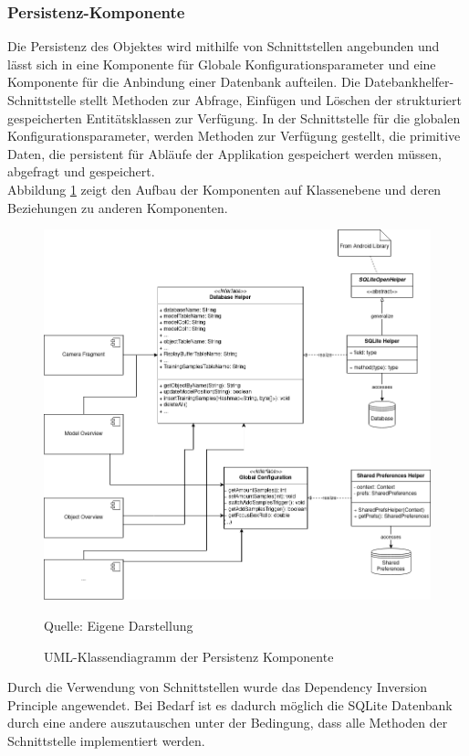 \documentclass[oneside]{ausarbeitung}
\begin{document}
\subsubsection{Persistenz-Komponente}
Die Persistenz des Objektes wird mithilfe von Schnittstellen angebunden und lässt sich in eine Komponente für Globale Konfigurationsparameter und eine Komponente für die Anbindung einer Datenbank aufteilen. Die Datebankhelfer-Schnittstelle stellt Methoden zur Abfrage, Einfügen und Löschen der strukturiert gespeicherten Entitätsklassen zur Verfügung. In der Schnittstelle für die globalen Konfigurationsparameter, werden Methoden zur Verfügung gestellt, die primitive Daten, die persistent für Abläufe der Applikation gespeichert werden müssen, abgefragt und gespeichert.\\
Abbildung \ref{fig:class-diagram-persistence} zeigt den Aufbau der Komponenten auf Klassenebene und deren Beziehungen zu anderen Komponenten.
\begin{figure}[hptb]
	\centering
	\includegraphics[height=0.6\textheight]{images/persistence-class-diagram.png}
	\caption{UML-Klassendiagramm der Persistenz Komponente} Quelle: Eigene Darstellung
	\label{fig:class-diagram-persistence}
\end{figure}
Durch die Verwendung von Schnittstellen wurde das Dependency Inversion Principle angewendet. Bei Bedarf ist es dadurch möglich die SQLite Datenbank durch eine andere auszutauschen unter der Bedingung, dass alle Methoden der Schnittstelle implementiert werden.
\end{document}
